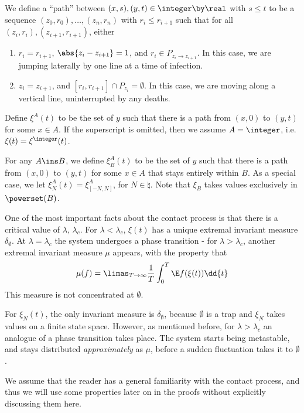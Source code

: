\documentclass{scrartcl}
\begin{document}
We define a ``path'' between $(x,s), (y,t) \in \integer \by \real$ with $s \leq t$ to be a sequence
$(z_{0},r_{0}), \ldots, (z_{n},r_{n})$ with $r_{i} \leq r_{i+1}$ such that for all $(z_{i},r_{i}),(z_{i+1},r_{i+1})$, either
\begin{enumerate}
  \item $r_{i} = r_{i+1}$, $\abs{z_{i} - z_{i+1}} = 1$, and $r_{i} \in P_{z_{i} \to z_{i+1}}$. In this case, we are jumping laterally by one line at a time of infection.
  \item $z_{i} = z_{i+1}$, and $[r_{i},r_{i+1}] \cap P_{z_{i}} = \emptyset$. In this case, we are moving along a vertical line, uninterrupted by any deaths.
\end{enumerate}

Define $\xi^{A}(t)$ to be the set of $y$ such that there is a path from $(x,0)$ to $(y,t)$ for some $x \in A$. If the superscript is omitted, then we assume $A = \integer$, i.e. $\xi(t) = \xi^{\integer}(t)$.

For any $A \ins B$, we define $\xi_{B}^{A}(t)$ to be the set of $y$ such that there is a path from $(x,0)$ to $(y,t)$ for some $x \in A$ that stays entirely within $B$. As a special case, we let $\xi_{N}^{A}(t) = \xi_{[-N,N]}^{A}$, for $N \in \natural$. Note that $\xi_{B}$ takes values exclusively in $\powerset(B)$.

One of the most important facts about the contact process is that there is a critical value of $\lambda$, $\lambda_{c}$. For $\lambda < \lambda_{c}$, $\xi(t)$ has a unique extremal invariant measure $\delta_{\emptyset}$. At $\lambda = \lambda_{c}$ the system undergoes a phase transition - for $\lambda > \lambda_{c}$, another extremal invariant measure $\mu$ appears, with the property that
\[ \mu(f) = \limas_{T \to \infty} \frac{1}{T} \int_{0}^{T} \E f(\xi(t)) \dd{t} \]
This measure is not concentrated at $\emptyset$.

For $\xi_{N}(t)$, the only invariant measure is $\delta_{\emptyset}$, because $\emptyset$ is a trap and $\xi_{N}$ takes values on a finite state space. However, as mentioned before, for $\lambda > \lambda_{c}$ an analogue of a phase transition takes place. The system starts being metastable, and stays distributed \emph{approximately} as $\mu$, before a sudden fluctuation takes it to $\emptyset$.

We assume that the reader has a general familiarity with the contact process, and thus we will use some properties later on in the proofs without explicitly discussing them here.
\end{document}

